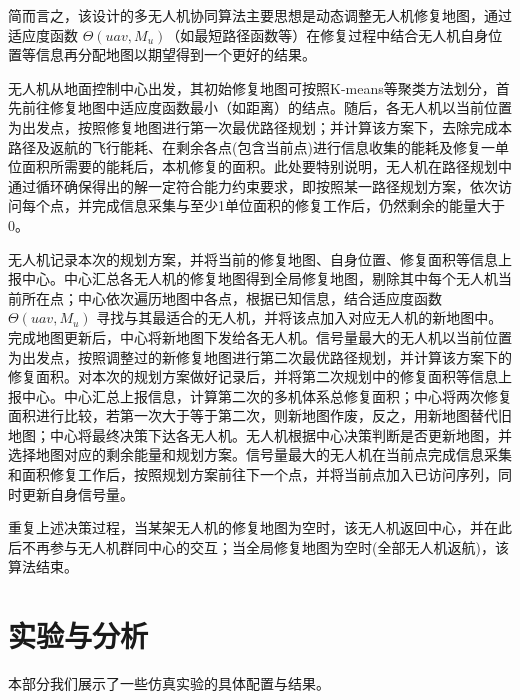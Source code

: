 \documentclass[AutoFakeBold]{LZUThesis}
\begin{document}
简而言之，该设计的多无人机协同算法主要思想是动态调整无人机修复地图，通过适应度函数 $\Theta(uav,M_u)$（如最短路径函数等）在修复过程中结合无人机自身位置等信息再分配地图以期望得到一个更好的结果。

无人机从地面控制中心出发，其初始修复地图可按照K-means等聚类方法划分，首先前往修复地图中适应度函数最小（如距离）的结点。随后，各无人机以当前位置为出发点，按照修复地图进行第一次最优路径规划；并计算该方案下，去除完成本路径及返航的飞行能耗、在剩余各点(包含当前点)进行信息收集的能耗及修复一单位面积所需要的能耗后，本机修复的面积。此处要特别说明，无人机在路径规划中通过循环确保得出的解一定符合能力约束要求，即按照某一路径规划方案，依次访问每个点，并完成信息采集与至少1单位面积的修复工作后，仍然剩余的能量大于0。

无人机记录本次的规划方案，并将当前的修复地图、自身位置、修复面积等信息上报中心。中心汇总各无人机的修复地图得到全局修复地图，剔除其中每个无人机当前所在点；中心依次遍历地图中各点，根据已知信息，结合适应度函数 $\Theta(uav,M_u)$ 寻找与其最适合的无人机，并将该点加入对应无人机的新地图中。完成地图更新后，中心将新地图下发给各无人机。信号量最大的无人机以当前位置为出发点，按照调整过的新修复地图进行第二次最优路径规划，并计算该方案下的修复面积。对本次的规划方案做好记录后，并将第二次规划中的修复面积等信息上报中心。中心汇总上报信息，计算第二次的多机体系总修复面积；中心将两次修复面积进行比较，若第一次大于等于第二次，则新地图作废，反之，用新地图替代旧地图；中心将最终决策下达各无人机。无人机根据中心决策判断是否更新地图，并选择地图对应的剩余能量和规划方案。信号量最大的无人机在当前点完成信息采集和面积修复工作后，按照规划方案前往下一个点，并将当前点加入已访问序列，同时更新自身信号量。

重复上述决策过程，当某架无人机的修复地图为空时，该无人机返回中心，并在此后不再参与无人机群同中心的交互；当全局修复地图为空时(全部无人机返航)，该算法结束。

\chapter{实验与分析}
本部分我们展示了一些仿真实验的具体配置与结果。
\label{sub:实验配置表格}
\end{document}
